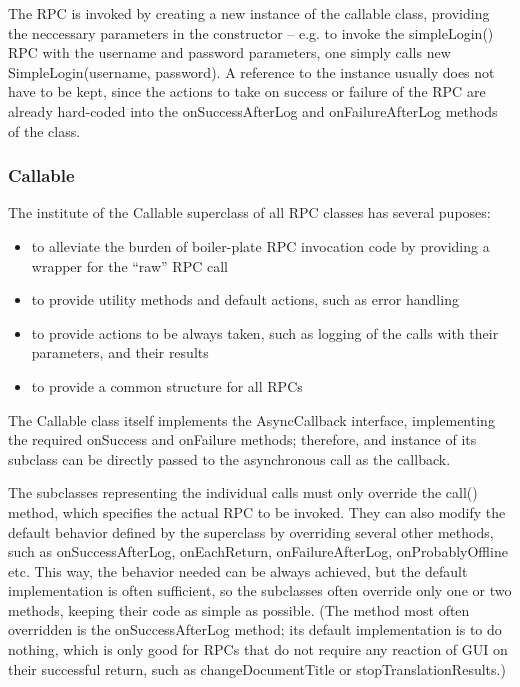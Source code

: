 The RPC is invoked by creating a new instance of the callable class, providing the neccessary parameters in the constructor -- e.g. to invoke the simpleLogin() RPC with the username and password parameters, one simply calls new SimpleLogin(username, password). A reference to the instance usually does not have to be kept, since the actions to take on success or failure of the RPC are already hard-coded into the onSuccessAfterLog and onFailureAfterLog methods of the class.

\subsubsection{Callable}

The institute of the Callable superclass of all RPC classes has several puposes:

\begin{itemize}
\item to alleviate the burden of boiler-plate RPC invocation code by providing a wrapper for the ``raw'' RPC call
\item to provide utility methods and default actions, such as error handling
\item to provide actions to be always taken, such as logging of the calls with their parameters, and their results
\item to provide a common structure for all RPCs
\end{itemize}

The Callable class itself implements the AsyncCallback interface, implementing the required onSuccess and onFailure methods; therefore, and instance of its subclass can be directly passed to the asynchronous call as the callback.

The subclasses representing the individual calls must only override the call() method, which specifies the actual RPC to be invoked.
They can also modify the default behavior defined by the superclass by overriding several other methods, such as onSuccessAfterLog, onEachReturn, onFailureAfterLog, onProbablyOffline etc. This way, the behavior needed can be always achieved, but the default implementation is often sufficient, so the subclasses often override only one or two methods, keeping their code as simple as possible. (The method most often overridden is the onSuccessAfterLog method; its default implementation is to do nothing, which is only good for RPCs that do not require any reaction of GUI on their successful return, such as changeDocumentTitle or stopTranslationResults.)

